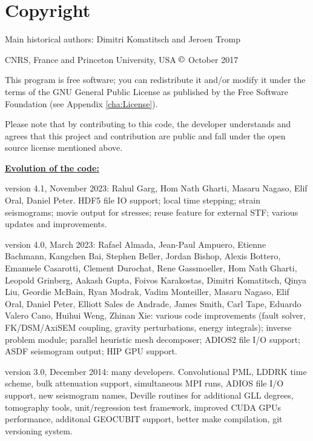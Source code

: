 
\chapter*{Copyright}

Main historical authors: Dimitri Komatitsch and Jeroen Tromp

CNRS, France and Princeton University, USA\newline
$\copyright$ October 2017\newline

\noindent
This program is free software; you can redistribute it and/or modify
it under the terms of the GNU General Public License as published
by the Free Software Foundation (see Appendix \ref{cha:License}).\newline

\noindent
Please note that by contributing to this code, the developer understands and agrees that this project and contribution
are public and fall under the open source license mentioned above.\newline

\noindent
\textbf{\underline{Evolution of the code:}}\newline

version 4.1, November 2023:
Rahul Garg, Hom Nath Gharti, Masaru Nagaso, Elif Oral, Daniel Peter.
HDF5 file IO support; local time stepping; strain seismograms; movie output for stresses;
reuse feature for external STF; various updates and improvements.\newline


version 4.0, March 2023:
Rafael Almada, Jean-Paul Ampuero, Etienne Bachmann, Kangchen Bai, Stephen Beller, Jordan Bishop, Alexis Bottero,
Emanuele Casarotti, Clement Durochat, Rene Gassmoeller, Hom Nath Gharti, Leopold Grinberg, Aakash Gupta,
Foivos Karakostas, Dimitri Komatitsch, Qinya Liu, Geordie McBain, Ryan Modrak, Vadim Monteiller, Masaru Nagaso, Elif Oral,
Daniel Peter, Elliott Sales de Andrade,  James Smith, Carl Tape, Eduardo Valero Cano, Huihui Weng, Zhinan Xie:
various code improvements (fault solver, FK/DSM/AxiSEM coupling, gravity perturbations, energy integrals);
inverse problem module; parallel heuristic mesh decomposer; ADIOS2 file I/O support;
ASDF seismogram output; HIP GPU support.\newline


version 3.0, December 2014: many developers.
Convolutional PML, LDDRK time scheme, bulk attenuation support, simultaneous MPI runs,
ADIOS file I/O support, new seismogram names,
Deville routines for additional GLL degrees, tomography tools, unit/regression test framework,
improved CUDA GPUs performance, additonal GEOCUBIT support, better make compilation,
git versioning system. \newline


